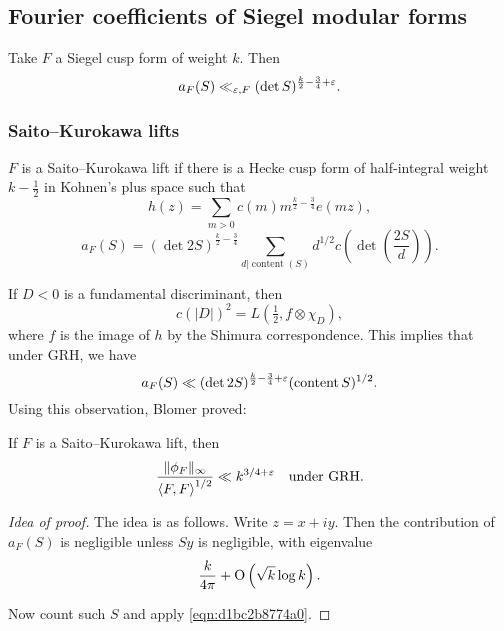 \documentclass[reqno]{amsart} 
\begin{document}
\subsection{Fourier coefficients of Siegel modular forms}
\begin{conjecture}
  Take $F$ a Siegel cusp form of weight $k$.  Then
  \begin{equation*}
    a_F (S) \ll_{\varepsilon, F} (\det S )^{\frac{k}{2} - \frac{3}{4} + \varepsilon }.
  \end{equation*}
\end{conjecture}

\subsubsection{Saito--Kurokawa lifts}
$F$ is a Saito--Kurokawa lift if there is a Hecke cusp form of half-integral weight $k - \tfrac{1}{2}$ in Kohnen's plus space such that
\begin{equation*}
  h (z) = \sum_{m > 0 } c (m) m^{\frac{k}{2} - \frac{3}{4}}
  e (m z),  
\end{equation*}
\begin{equation*}
  a_F (S) = \left( \det 2 S \right)^{\frac{k}{2} - \frac{3}{4}}
  \sum_{d | \operatorname{content}(S)}
  d^{1/2} c \left( \det \left( \frac{2 S}{d} \right) \right).
\end{equation*}

If $D < 0$ is a fundamental discriminant, then
\begin{equation*}
  c (\lvert D \rvert)^2 = L (\tfrac{1}{2}, f \otimes \chi_D ),
\end{equation*}
where $f$ is the image of $h$ by the Shimura correspondence.  This implies that under GRH, we have
\begin{equation}\label{eqn:d1bc2b8774a0}
  a_F (S) \ll (\det 2 S )^{\frac{k}{2} - \frac{3}{4} + \varepsilon }
  (\operatorname{content} S)^{1/2}.  
\end{equation}
Using this observation, Blomer proved:
\begin{corollary}[Blomer]
  If $F$ is a Saito--Kurokawa lift, then
  \begin{equation*}
    \frac{\lVert \phi_F  \rVert_{\infty}}{\left\langle F, F \right\rangle^{1/2} }
    \ll k^{3/4 + \varepsilon }
    \quad
    \text{under GRH.}
  \end{equation*}
\end{corollary}
\begin{proof}[Idea of proof]
  The idea is as follows.  Write $z = x + i y$.  Then the contribution of $a_F (S) $ is negligible unless $S y$ is negligible, with eigenvalue
  \begin{equation*}
    \frac{k}{4 \pi } + \operatorname{O}\left(\sqrt{k } \log k\right).
  \end{equation*}

  Now count such $S$ and apply \eqref{eqn:d1bc2b8774a0}.
\end{proof}
\end{document}
